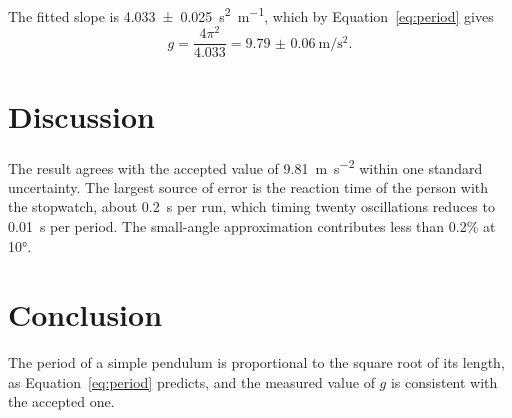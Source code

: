\documentclass[11pt,a4paper]{article}
\begin{document}
The fitted slope is \SI{4.033(25)}{\second\squared\per\metre}, which by Equation~\eqref{eq:period} gives
\[
  g = \frac{4\pi^2}{4.033} = \SI{9.79(6)}{\metre\per\second\squared}.
\]

\section{Discussion}

The result agrees with the accepted value of \SI{9.81}{\metre\per\second\squared} within one standard uncertainty. The largest source of error is the reaction time of the person with the stopwatch, about \SI{0.2}{\second} per run, which timing twenty oscillations reduces to \SI{0.01}{\second} per period. The small-angle approximation contributes less than 0.2\% at \ang{10}.

\section{Conclusion}

The period of a simple pendulum is proportional to the square root of its length, as Equation~\eqref{eq:period} predicts, and the measured value of $g$ is consistent with the accepted one.
\end{document}
